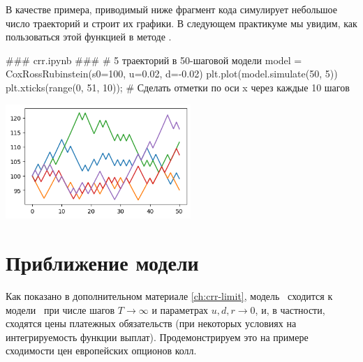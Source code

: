 В качестве примера, приводимый ниже фрагмент кода симулирует небольшое число траекторий и строит их графики.
В следующем практикуме мы увидим, как пользоваться этой функцией в методе \mc.
\begin{python}
### crr.ipynb ###
# 5 траекторий в 50-шаговой модели
model = CoxRossRubinstein(s0=100, u=0.02, d=-0.02)
plt.plot(model.simulate(50, 5))
plt.xticks(range(0, 51, 10));  # Сделать отметки по оси x через каждые 10 шагов
\end{python}

\noindent
\includegraphics[width=7cm]{pic/crr-path-many.png}


\section{Приближение модели \bs}
Как показано в дополнительном материале \ref{ch:crr-limit}, модель \crr\ сходится к модели \bs\ при числе шагов $T\to\infty$ и параметрах $u,d,r\to0$, и, в частности, сходятся цены платежных обязательств (при некоторых условиях на интегрируемость функции выплат).
Продемонстрируем это на примере сходимости цен европейских опционов колл.

